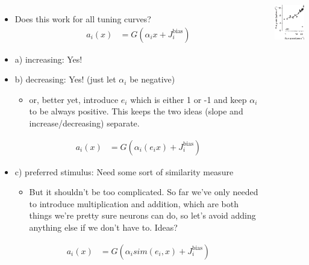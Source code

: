 \documentclass[handout,aspectratio=169]{beamer}
\begin{document}
\begin{frame}
	\begin{columns}
		\begin{itemize}
			\item Does this work for all tuning curves?
			\vspace*{-0.3cm}			
			\begin{align*}
				a_i(x) &= G(\alpha_i x + J^\mathrm{bias}_i)			
			\end{align*}			
			\item<2-> a) increasing: Yes!
			\item<3-> b) decreasing: Yes! (just let $\alpha_i$ be negative)
			\begin{itemize}
			\item or, better yet, introduce $e_i$ which is either 1 or -1 and keep $\alpha_i$ to be always positive.  This keeps the two ideas (slope and increase/decreasing) separate. 
			\end{itemize}
			\vspace*{-0.3cm}
			\begin{align*}
				a_i(x) &= G(\alpha_i (e_i x) + J^\mathrm{bias}_i)			
			\end{align*}			
			\item<4-> c) preferred stimulus: Need some sort of similarity measure
			\begin{itemize}
				\item<4-> But it shouldn't be too complicated.  So far we've only needed to introduce multiplication and addition, which are both things we're pretty sure neurons can do, so let's avoid adding anything else if we don't have to.  Ideas?
			\end{itemize} 
			\vspace*{-0.3cm}		
			\begin{align*}
				a_i(x) &= G(\alpha_i sim(e_i, x) + J^\mathrm{bias}_i)			
			\end{align*}			
		\end{itemize}
		\includegraphics[scale=0.75]{media/saleem_et_al_tuning_curves_a.pdf} \\

\end{columns}
\end{frame}
\end{document}

